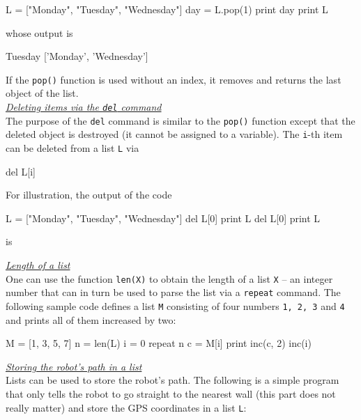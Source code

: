 \begin{bluecode}
L = ["Monday", "Tuesday", "Wednesday"]
day = L.pop(1)
print day
print L
\end{bluecode}
whose output is 

\begin{greencode}
Tuesday
['Monday', 'Wednesday']
\end{greencode}
If the {\tt pop()} function is used without an index, it removes
and returns the last object of the list.\\

\noindent
\underline{\em Deleting items via the {\tt del} command}\\

The purpose of the {\tt del} command is similar to the {\tt pop()} function
except that the deleted object is destroyed (it cannot be assigned to a variable).
The {\tt i}-th item can be deleted from a list {\tt L} via 

\begin{bluecode}
del L[i]
\end{bluecode}
For illustration, the output of the code 

\begin{bluecode}
L = ["Monday", "Tuesday", "Wednesday"]
del L[0]
print L
del L[0]
print L
\end{bluecode}
is 

\begin{greencode}
\end{greencode}
\underline{\em Length of a list}\\

One can use the function {\tt len(X)} to obtain the length of a list {\tt X} -- an integer
number that can in turn be used to parse the list via a {\tt repeat} command.
The following sample code defines a list {\tt M} consisting of four numbers 
{\tt 1, 2, 3} and {\tt 4} and prints all of them increased by two: 

\begin{bluecode}
M = [1, 3, 5, 7]
n = len(L)
i = 0
repeat n
    c = M[i]
    print inc(c, 2)
    inc(i)
\end{bluecode}
\underline{\em Storing the robot's path in a list}\\

Lists can be used to store the robot's path. The following 
is a simple program that only tells the robot to go straight to the 
nearest wall (this part does not really matter) and store the GPS
coordinates in a list {\tt L}:

